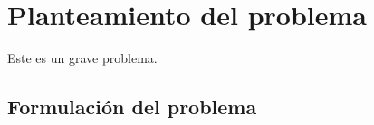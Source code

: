 \section{Planteamiento del problema}
Este es un grave problema.

\subsection{Formulación del problema}